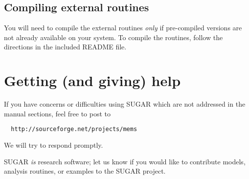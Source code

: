 \subsection{Compiling external routines}

You will need to compile the external routines \emph{only} if
pre-compiled versions are not already available on your system.
To compile the routines, follow the directions in the included
README file.


\section{Getting (and giving) help}

If you have concerns or difficulties using SUGAR which are not addressed
in the manual sections, feel free to post to
\begin{verbatim}
  http://sourceforge.net/projects/mems
\end{verbatim}
We will try to respond promptly.

SUGAR \emph{is} research software; let us know if you would like to contribute
models, analysis routines, or examples to the SUGAR project.
